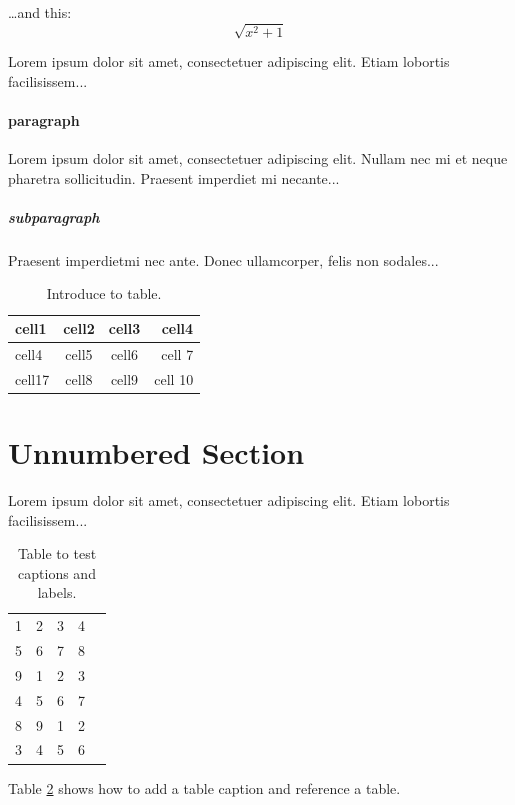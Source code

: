 \documentclass[12pt]{book}
\begin{document}
\ldots and this:
\begin{equation}
\sqrt{x^2+1}
\end{equation}

Lorem ipsum dolor sit amet, consectetuer adipiscing elit. Etiam lobortis facilisissem...

\paragraph{paragraph}
Lorem ipsum dolor sit amet, consectetuer adipiscing elit. Nullam nec mi et neque pharetra sollicitudin.  Praesent imperdiet mi necante...

\subparagraph{subparagraph}
Praesent imperdietmi nec ante. Donec ullamcorper, felis non sodales...

\begin{table}
	\centering
    \begin{tabular}{l || c c r}
    	\hline
    	cell1 & cell2 & cell3 & cell4 \\
    	\hline
    	\hline
    	cell4 & cell5 & cell6 & cell 7\\
    	cell17 & cell8 & cell9 & cell 10\\
    	\hline
    \end{tabular}
    \caption{Introduce to table.}
    \label{tab:intro}
\end{table}

\section*{Unnumbered Section}
Lorem ipsum dolor sit amet, consectetuer adipiscing elit.  
Etiam lobortis facilisissem...

\begin{table}
    \centering
    \begin{tabular}{ccccc}
       1  & 2 & 3 & 4 & \\
       5  & 6 & 7 & 8 & \\
       9  & 1 & 2 & 3 & \\
       4  & 5 & 6 & 7 & \\
       8  & 9 & 1 & 2 & \\
       3  & 4 & 5 & 6 & \\
    \end{tabular}
    \caption{Table to test captions and labels.}
    \label{tab:data}
\end{table}

Table \ref{tab:data} shows how to add a table caption and reference a table.
\end{document}
